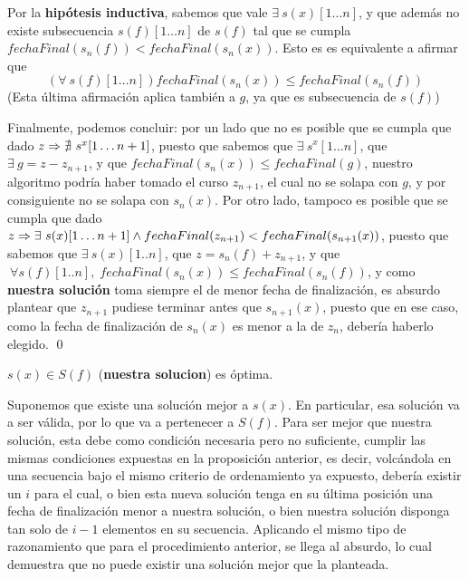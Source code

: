 \documentclass[11pt, a4paper, twoside]{article}
\begin{document}
\begin{demostracion}
Por la \textbf{hipótesis inductiva}, sabemos que vale $\exists \ s(x)[1 \dots n]$, y
que además no existe subsecuencia $s(f)[1 \dots n]$ de $s(f)$ tal que se cumpla
$fechaFinal(s_{n}(f))<fechaFinal(s_{n}(x))$. Esto es es equivalente a afirmar que
\[
	(\forall \ s(f)[1 \dots n]) fechaFinal(s_{n}(x)) \leq fechaFinal(s_{n}(f))
\]
{}
(Esta última afirmación aplica también a $g$, ya que es subsecuencia de $s(f)$)


Finalmente, podemos concluir: por un lado que no es posible que 
se cumpla que dado $z \Rightarrow \nexists \ s^{x}[1 \dots n+1]$, puesto que sabemos 
que $\exists \ s^{x}[1 \dots n]$, que $\exists \ g = z - z_{n+1}$, 
y que $fechaFinal(s_{n}(x)) \leq fechaFinal(g)$, nuestro algoritmo podría haber
tomado el curso $z_{n+1}$, el cual no se solapa con $g$, y por 
consiguiente no se solapa con $s_{n}(x)$. Por otro lado, tampoco es posible
que se cumpla que dado $z \Rightarrow \exists \ s(x)[1 \dots n+1] \wedge 
fechaFinal(z_{n+1}) < fechaFinal(s_{n+1}(x))$, puesto que sabemos que
$\exists \ s(x)[1..n]$, que $z = s_{n}(f) + z_{n+1}$, y que
$ \ \forall s(f)[1..n], \; fechaFinal(s_{n}(x)) \leq fechaFinal(s_{n}(f))$,
y como \textbf{nuestra solución} toma siempre el de menor fecha de finalización, 
es absurdo plantear que $z_{n+1}$ pudiese terminar antes que $s_{n+1}(x)$, puesto
que en ese caso, como la fecha de finalización de $s_{n}(x)$ es menor a la de $z_{n}$,
debería haberlo elegido. \qed
\end{demostracion}

\begin{prop}
$s(x) \in S(f)$ (\textbf{nuestra solucion}) es óptima.
\end{prop}

\begin{demostracion}
Suponemos que existe una solución mejor a $s(x)$. En particular, esa solución 
va a ser válida, por lo que va a pertenecer a $S(f)$. Para ser mejor que
nuestra solución, esta debe como condición necesaria pero no suficiente,
cumplir las mismas condiciones expuestas en la proposición anterior, es decir,
volcándola en una secuencia bajo el mismo criterio de ordenamiento ya expuesto,
debería existir un $i$ para el cual, o bien esta nueva solución tenga en su
última posición una fecha de finalización menor a nuestra solución, o bien
nuestra solución disponga tan solo de $i-1$ elementos en su secuencia.
Aplicando el mismo tipo de razonamiento que para el procedimiento anterior, 
se llega al absurdo, lo cual demuestra que no puede existir una solución 
mejor que la planteada.
\end{demostracion}
\end{document}
